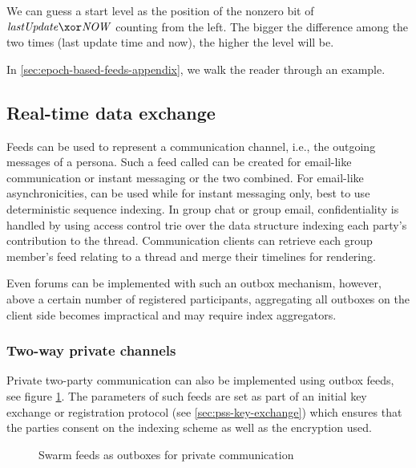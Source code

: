 We can guess a start level as the position of the nonzero bit of $\mathit{lastUpdate}\xor \mathit{NOW}$ counting from the left. The bigger the difference among the two times (last update time and now), the higher the level will be.

In \ref{sec:epoch-based-feeds-appendix}, we walk the reader through an example.

\subsection{Real-time data exchange \statusyellow}\label{sec:feed-as-channel}

Feeds can be used to represent a communication channel, i.e., the outgoing messages of a persona. Such a feed called  can be created for  email-like  communication or instant messaging or the two combined. For email-like asynchronicities,  can be used while for instant messaging only, best to use deterministic sequence indexing. 
In group chat or group email, confidentiality is handled by using access control trie over the data structure indexing each party's contribution to the thread. Communication clients can retrieve each group member's feed relating to a thread and merge their timelines for rendering. 

Even forums can be implemented with such an outbox mechanism, however, above a certain number of registered participants, aggregating all outboxes on the client side becomes impractical and may require index aggregators.

\subsubsection{Two-way private channels}
 
Private two-party communication can also be implemented using outbox feeds, see figure \ref{fig:feeds-as-channel}. The parameters of such feeds are set as part of an initial key exchange or registration protocol (see \ref{sec:pss-key-exchange}) which ensures that the parties consent on the indexing scheme as well as the encryption used. 


\begin{figure}[h!]
  \centering
  \caption[Swarm feeds as outboxes \statusred]{Swarm  feeds as outboxes for private communication}
\label{fig:feeds-as-channel}
\end{figure}


